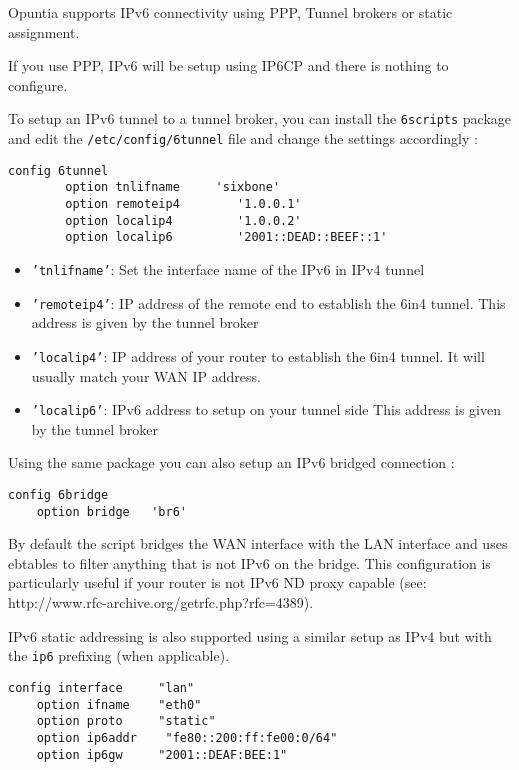 Opuntia supports IPv6 connectivity using PPP, Tunnel brokers or static
assignment.

If you use PPP, IPv6 will be setup using IP6CP and there is nothing to
configure.

To setup an IPv6 tunnel to a tunnel broker, you can install the
\texttt{6scripts} package and edit the \texttt{/etc/config/6tunnel}
file and change the settings accordingly :

\begin{Verbatim}
config 6tunnel
        option tnlifname     'sixbone'
        option remoteip4        '1.0.0.1'
        option localip4         '1.0.0.2'
        option localip6         '2001::DEAD::BEEF::1'
\end{Verbatim}

\begin{itemize}
    \item{\texttt{'tnlifname'}:}
        Set the interface name of the IPv6 in IPv4 tunnel
    \item{\texttt{'remoteip4'}:}
        IP address of the remote end to establish the 6in4 tunnel.
	This address is given by the tunnel broker
    \item{\texttt{'localip4'}:}
	IP address of your router to establish the 6in4 tunnel.
	It will usually match your WAN IP address.
    \item{\texttt{'localip6'}:}
	IPv6 address to setup on your tunnel side
	This address is given by the tunnel broker
\end{itemize}

Using the same package you can also setup an IPv6 bridged connection :

\begin{Verbatim}
config 6bridge
	option bridge	'br6'
\end{Verbatim}

By default the script bridges the WAN interface with the LAN interface
and uses ebtables to filter anything that is not IPv6 on the bridge.
This configuration is particularly useful if your router is not
IPv6 ND proxy capable (see: http://www.rfc-archive.org/getrfc.php?rfc=4389).


IPv6 static addressing is also supported using a similar setup as
IPv4 but with the \texttt{ip6} prefixing (when applicable).

\begin{Verbatim}
config interface     "lan"
    option ifname    "eth0"
    option proto     "static"
    option ip6addr    "fe80::200:ff:fe00:0/64"
    option ip6gw     "2001::DEAF:BEE:1"
\end{Verbatim}
